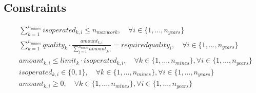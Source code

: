 \documentclass{article}
\begin{document}
\subsection*{Constraints}
\begin{align}
    & \sum_{k=1}^{n_{mines}} isoperated_{k, i} \leq n_{maxwork}, \quad \forall i \in \{1, \ldots, n_{years}\} \tag{1} \\
    & \sum_{k=1}^{n_{mines}} quality_k \cdot \frac{amount_{k, i}}{\sum_{j=1}^{n_{mines}} amount_{j, i}} = requiredquality_i, \quad \forall i \in \{1, \ldots, n_{years}\} \tag{2} \\
    & amount_{k, i} \leq limit_k \cdot isoperated_{k, i}, \quad \forall k \in \{1, \ldots, n_{mines}\}, \forall i \in \{1, \ldots, n_{years}\} \tag{3} \\
    & isoperated_{k, i} \in \{0, 1\}, \quad \forall k \in \{1, \ldots, n_{mines}\}, \forall i \in \{1, \ldots, n_{years}\} \tag{4} \\
    & amount_{k, i} \geq 0, \quad \forall k \in \{1, \ldots, n_{mines}\}, \forall i \in \{1, \ldots, n_{years}\} \tag{5}
\end{align}
\end{document}
